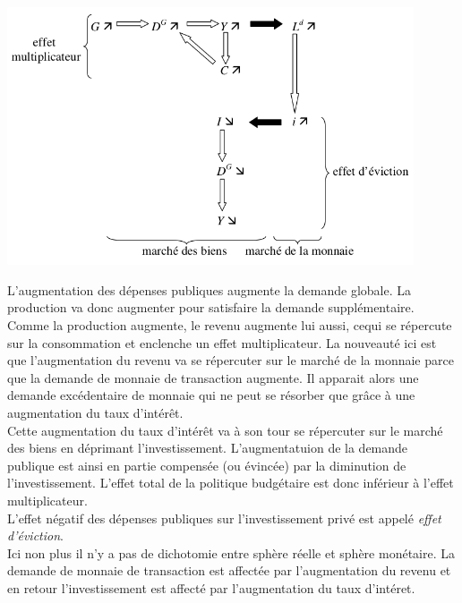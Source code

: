 \documentclass[10pt]{book}
\begin{document}
\begin{center}
  \includegraphics[width=12cm]{graph38.png}
\end{center}
L'augmentation des dépenses publiques augmente la demande globale. La production va donc augmenter pour satisfaire la demande supplémentaire. Comme la production augmente, le revenu augmente lui aussi, cequi se répercute sur la consommation et enclenche un effet multiplicateur. La nouveauté ici est que l'augmentation du revenu va se répercuter sur le marché de la monnaie parce que la demande de monnaie de transaction augmente. Il apparait alors une demande excédentaire de monnaie qui ne peut se résorber que grâce à une augmentation du taux d'intérêt. \\
Cette augmentation du taux d'intérêt va à son tour se répercuter sur le marché des biens en déprimant l'investissement. L'augmentatuion de la demande publique est ainsi en partie compensée (ou évincée) par la diminution de l'investissement. L'effet total de la politique budgétaire est donc inférieur à l'effet multiplicateur. \\
L'effet négatif des dépenses publiques sur l'investissement privé est appelé \textit{effet d'éviction}. \\
Ici non plus il n'y a pas de dichotomie entre sphère réelle et sphère monétaire. La demande de monnaie de transaction est affectée par l'augmentation du revenu et en retour l'investissement est affecté par l'augmentation du taux d'intéret.
\end{document}
